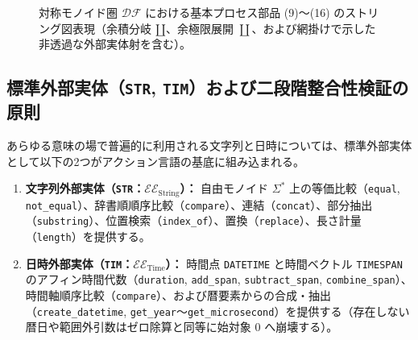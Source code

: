 \documentclass[11pt,a4paper]{ltjsarticle}
\theoremstyle{definition}
\theoremstyle{plain}
\theoremstyle{remark}
\newcommand{\DF}{\mathcal{DF}}
\begin{document}
\begin{figure}[htbp]
\caption{対称モノイド圏 $\DF$ における基本プロセス部品 (9)〜(16) のストリング図表現（余積分岐 $\amalg$、余極限展開 $\coprod$、および網掛けで示した非透過な外部実体射を含む）。}
\label{fig:primitives-9-16}
\end{figure}
\subsection{標準外部実体（\texttt{STR}, \texttt{TIM}）および二段階整合性検証の原則}
あらゆる意味の場で普遍的に利用される文字列と日時については、標準外部実体として以下の2つがアクション言語の基底に組み込まれる。
\begin{enumerate}
    \item \textbf{文字列外部実体（\texttt{STR}：$\mathcal{EE}_{\mathrm{String}}$）：} 自由モノイド $\Sigma^*$ 上の等価比較（\texttt{equal}, \texttt{not\_equal}）、辞書順順序比較（\texttt{compare}）、連結（\texttt{concat}）、部分抽出（\texttt{substring}）、位置検索（\texttt{index\_of}）、置換（\texttt{replace}）、長さ計量（\texttt{length}）を提供する。
    \item \textbf{日時外部実体（\texttt{TIM}：$\mathcal{EE}_{\mathrm{Time}}$）：} 時間点 \texttt{DATETIME} と時間ベクトル \texttt{TIMESPAN} のアフィン時間代数（\texttt{duration}, \texttt{add\_span}, \texttt{subtract\_span}, \texttt{combine\_span}）、時間軸順序比較（\texttt{compare}）、および暦要素からの合成・抽出（\texttt{create\_datetime}, \texttt{get\_year}〜\texttt{get\_microsecond}）を提供する（存在しない暦日や範囲外引数はゼロ除算と同等に始対象 $0$ へ崩壊する）。
\end{enumerate}
\end{document}
